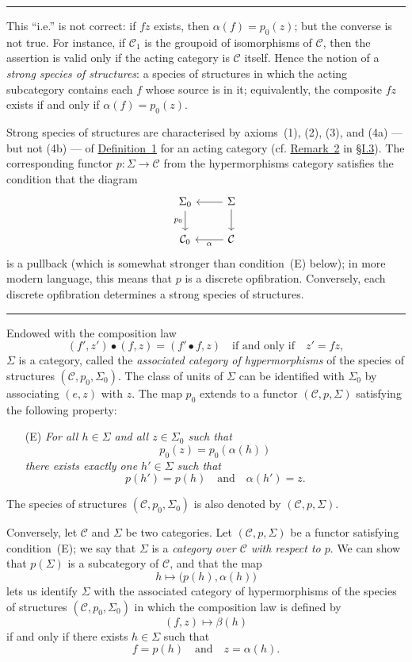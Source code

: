 \documentclass[a4paper,oneside,nobib,nofonts,notitlepage,notoc,nols,fleqn,justified]{tufte-book}
\newenvironment{longcomm}[1]
  {\begin{fullwidth}\bigskip\hrule\phantomsection\par\bigskip\noindent[#1]\rmfamily}
  {\par\bigskip\hrule\bigskip\end{fullwidth}}
\newcommand{\oldpage}[1]{{\reversemarginpar\marginnote{\raggedleft\footnotesize\textit{p.~#1}}}}
\newcommand{\CC}{\mathcal{C}}
\begin{document}
\begin{longcomm}{23.1}
  This ``i.e.'' is not correct: if $fz$ exists, then $\alpha(f)=p_0(z)$;
  but the converse is not true.
  For instance, if $\CC_1$ is the groupoid of isomorphisms of $\CC$, then the assertion is valid only if the acting category is $\CC$ itself.
  Hence the notion of a \emph{strong species of structures}: a species of structures in which the acting subcategory contains each $f$ whose source is in it;
  equivalently, the composite $fz$ exists if and only if $\alpha(f)=p_0(z)$.

  Strong species of structures are characterised by axioms~(1), (2), (3), and (4a) --- but not (4b) --- of \hyperref[definition:i-1]{Definition~1} for an acting category (cf. \hyperref[remark:i-2]{Remark~2} in \hyperref[section:i.3]{§I.3}).
  The corresponding functor $p\colon\Sigma\to\CC$ from the hypermorphisms category satisfies the condition that the diagram
  \[
    \begin{tikzcd}
      \Sigma_0
        \ar[d,swap,"p_0"]
      & \Sigma
        \ar[l]
        \ar[d]
    \\\CC_0
      & \CC
        \ar[l,"\alpha"]
    \end{tikzcd}
  \]
  is a pullback (which is somewhat stronger than condition~(E) below);
  in more modern language, this means that $p$ is a discrete opfibration.
  Conversely, each discrete opfibration determines a strong species of structures.
\end{longcomm}

Endowed with the composition law
\[
  (f',z')\bullet(f,z)
  = (f'\bullet f,z)
  \quad\text{if and only if}\quad
  z'=fz,
\]
\oldpage{352}
$\Sigma$ is a category, called the \emph{associated category of hypermorphisms} of the species of structures $(\CC,p_0,\Sigma_0)$.
The class of units of $\Sigma$ can be identified with $\Sigma_0$ by associating $(e,z)$ with $z$.
The map $p_0$ extends to a functor $(\CC,p,\Sigma)$ satisfying the following property:
\begin{enumerate}
  \item[\normalfont(E)] \itshape
    For all $h\in\Sigma$ and all $z\in\Sigma_0$ such that
    \[
      p_0(z)
      = p_0(\alpha(h))
    \]
    there exists exactly one $h'\in\Sigma$ such that
    \[
      p(h')=p(h)
      \quad\text{and}\quad
      \alpha(h')=z.
    \]
\end{enumerate}
The species of structures $(\CC,p_0,\Sigma_0)$ is also denoted by $(\CC,p,\Sigma)$.

Conversely, let $\CC$ and $\Sigma$ be two categories.
Let $(\CC,p,\Sigma)$ be a functor satisfying condition~(E);
we say that $\Sigma$ is a \emph{category over $\CC$ with respect to $p$}.
We can show \cite{3a} that $p(\Sigma)$ is a subcategory of $\CC$, and that the map
\[
  h\longmapsto \big(p(h),\alpha(h)\big)
\]
lets us identify $\Sigma$ with the associated category of hypermorphisms of the species of structures $(\CC,p_0,\Sigma_0)$ in which the composition law is defined by
\[
  (f,z) \longmapsto \beta(h)
\]
if and only if there exists $h\in\Sigma$ such that
\[
  f=p(h)
  \quad\text{and}\quad
  z=\alpha(h).
\]
\end{document}
